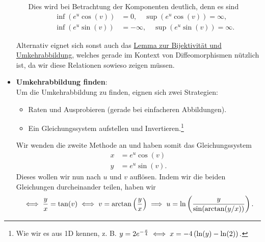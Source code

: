 \begin{Beispiel}
\begin{itemize}
\begin{itemize}
        Dies wird bei Betrachtung der Komponenten deutlich, denn es sind
        \begin{align*}
            \inf(e^u\cos(v))&=0,\quad\sup (e^u\cos(v))=\infty,\\
            \inf(e^u\sin(v))&=-\infty,\quad\sup (e^u\sin(v))=\infty.
        \end{align*}
    \end{itemize}
    Alternativ eignet sich sonst auch das \hyperref[wdh:09BijektivitatUmkehrabbildung]{Lemma zur Bijektivität und Umkehrabbildung}, welches gerade im Kontext von Diffeomorphismen nützlich ist, da wir diese Relationen sowieso zeigen müssen.
    \item \textbf{Umkehrabbildung finden}:\\
    Um die Umkehrabbildung zu finden, eignen sich zwei Strategien:
    \begin{itemize}
        \item Raten und Ausprobieren (gerade bei einfacheren Abbildungen).
        \item Ein Gleichungssystem aufstellen und Invertieren.\footnote{Wie wir es aus 1D kennen, z. B. $y=2e^{-\frac{x}{4}}\iff x=-4\left({\ln(y)-\ln(2)}\right).$}
    \end{itemize}
    Wir wenden die zweite Methode an und haben somit das Gleichungssystem
    \begin{align*}
        x&=e^u\cos (v)\\
        y&=e^u\sin(v).
    \end{align*}
    Dieses wollen wir nun nach $u$ und $v$ auflösen. Indem wir die beiden Gleichungen durcheinander teilen, haben wir
    \begin{equation*}
        \iff\frac{y}{x}=\tan(v)\iff v=\arctan\left({\frac{y}{x}}\right)\implies u=\ln\left({\frac{y}{\sin(\arctan(y/x))}}\right).
    \end{equation*}
\end{itemize}
\end{Beispiel}
